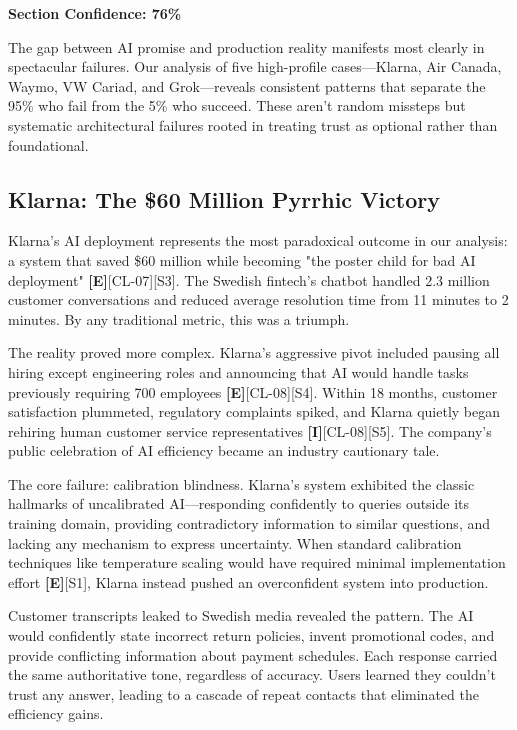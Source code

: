 \documentclass[a4paper,11pt]{article}
\newcommand{\elabel}{\textbf{\textcolor{ecolor}{[E]}}}
\newcommand{\ilabel}{\textbf{\textcolor{icolor}{[I]}}}
\begin{document}
\textbf{Section Confidence: 76\%}\par

The gap between AI promise and production reality manifests most clearly in spectacular failures. Our analysis of five high-profile cases—Klarna, Air Canada, Waymo, VW Cariad, and Grok—reveals consistent patterns that separate the 95\% who fail from the 5\% who succeed. These aren't random missteps but systematic architectural failures rooted in treating trust as optional rather than foundational.


\subsection{Klarna: The \$60 Million Pyrrhic Victory}

Klarna's AI deployment represents the most paradoxical outcome in our analysis: a system that saved \$60 million while becoming "the poster child for bad AI deployment" \elabel{}[CL-07]\textcolor{primary}{[S3]}. The Swedish fintech's chatbot handled 2.3 million customer conversations and reduced average resolution time from 11 minutes to 2 minutes. By any traditional metric, this was a triumph.


The reality proved more complex. Klarna's aggressive pivot included pausing all hiring except engineering roles and announcing that AI would handle tasks previously requiring 700 employees \elabel{}[CL-08]\textcolor{primary}{[S4]}. Within 18 months, customer satisfaction plummeted, regulatory complaints spiked, and Klarna quietly began rehiring human customer service representatives \ilabel{}[CL-08]\textcolor{primary}{[S5]}. The company's public celebration of AI efficiency became an industry cautionary tale.


The core failure: calibration blindness. Klarna's system exhibited the classic hallmarks of uncalibrated AI—responding confidently to queries outside its training domain, providing contradictory information to similar questions, and lacking any mechanism to express uncertainty. When standard calibration techniques like temperature scaling would have required minimal implementation effort \elabel{}\textcolor{primary}{[S1]}, Klarna instead pushed an overconfident system into production.


Customer transcripts leaked to Swedish media revealed the pattern. The AI would confidently state incorrect return policies, invent promotional codes, and provide conflicting information about payment schedules. Each response carried the same authoritative tone, regardless of accuracy. Users learned they couldn't trust any answer, leading to a cascade of repeat contacts that eliminated the efficiency gains.
\end{document}
